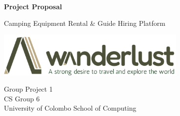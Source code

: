 \begin{titlepage}
	\begin{center}
		\vspace*{1cm}


{\fontsize{30}{30}\selectfont \textbf{Project Proposal}}

    
	

		\vspace{1.5cm}

  {\fontsize{20}{30}\selectfont Camping Equipment Rental \& Guide Hiring Platform}
		

		\vspace{1.5cm}
		\vfill
	\includegraphics[width=0.7\textwidth]{Images/logo.png}
		\vfill

		\vspace{0.8cm}


		Group Project 1\\ CS Group 6\\

	\vspace{0.5\baselineskip}	
	{University of Colombo School of Computing} 
 
    \vspace*{6\baselineskip} 

	\end{center}
\end{titlepage}